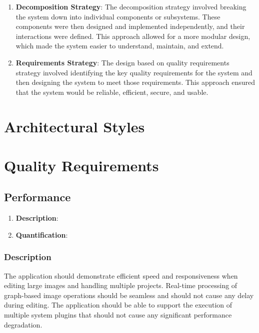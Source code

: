 \documentclass[11pt,a4paper]{article}
\begin{document}
\begin{enumerate}[label*=\arabic*.]
	\item[\textbullet] {\bf Decomposition Strategy}: The decomposition strategy
	involved breaking the system down into individual components or subsystems.
	These components were then designed and implemented independently, and their
	interactions were defined. This approach allowed for a more modular design,
	which made the system easier to understand, maintain, and extend.

	\item[\textbullet] {\bf Requirements Strategy}: The design based on quality
	requirements strategy involved identifying the key quality requirements for
	the system and then designing the system to meet those requirements. This
	approach ensured that the system would be reliable, efficient, secure, and
	usable.
\end{enumerate}


\section{Architectural Styles}


\pagebreak

\section{Quality Requirements}

\subsection{Performance}

\begin{enumerate}[label*=\arabic*.]
	\item[\textbullet] {\bf Description}:

	\item[\textbullet] {\bf Quantification}:
\end{enumerate}

\subsubsection*{Description}
The application should demonstrate efficient speed and
responsiveness when editing large images and handling multiple projects.
Real-time processing of graph-based image operations should be seamless and
should not cause any delay during editing. The application should be able to
support the execution of multiple system plugins that should not cause any
significant performance degradation.
\end{document}
